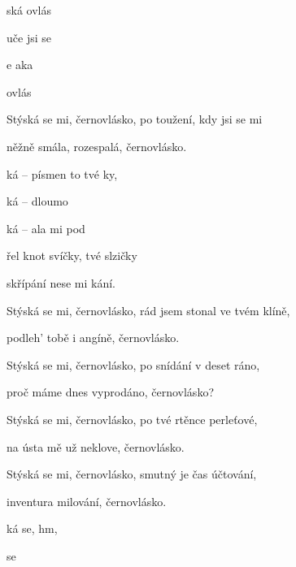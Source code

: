 

\zs
{}ská  ovlás

uče  jsi se 

e aka

ovlás 
\ks

\zs
Stýská se mi, černovlásko, po toužení, kdy jsi se mi

něžně smála, rozespalá, černovlásko.
\ks

\zr
{}ká --  písmen to tvé ky,

ká --  dloumo

ká -- ala  mi pod 

řel knot svíčky,  tvé slzičky

 skřípání nese mi kání.
\kr

\zs
Stýská se mi, černovlásko, rád jsem stonal ve tvém klíně,

podleh' tobě i angíně, černovlásko.
\ks

\zs
Stýská se mi, černovlásko, po snídání v deset ráno,

proč máme dnes vyprodáno, černovlásko?
\ks


\zr \kr


\zs
Stýská se mi, černovlásko, po tvé rtěnce perleťové,

na ústa mě už neklove, černovlásko.
\ks

\zs
Stýská se mi, černovlásko, smutný je čas účtování,

inventura milování, černovlásko.
\ks

\zr \kr

\zr
{}ká se,  hm, 

 se   
\kr

\kp






